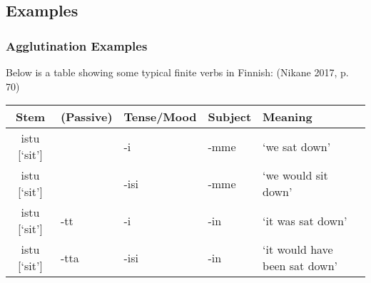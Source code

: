 \documentclass{beamer}
\begin{document}
\subsection{Examples}

\begin{frame}
	\frametitle{Agglutination Examples}
    Below is a table showing some typical finite verbs in Finnish: (Nikane 2017, p. 70)
    {\scriptsize
    \begin{center}
        \begin{tabular}{|c|p{1cm}|p{1cm}|p{2.5cm}|p{2cm}|}
        \hline
        Stem & (Passive) & Tense/Mood & Subject & Meaning\\\hline
        istu [`sit'] & & -i\newline [PAST] & -mme  & `we sat down'\\\hline
        istu [`sit'] & & -isi\newline [COND] & -mme  & `we would sit down'\\\hline
        istu [`sit'] & -tt \newline[passive] & -i\newline [PAST] & -in  & `it was sat down'\\\hline
        istu [`sit'] & -tta \newline[passive]& -isi\newline [COND] & -in  & `it would have been sat down'\\\hline
        \end{tabular}
    \end{center}
    }
	
\end{frame}
\end{document}
